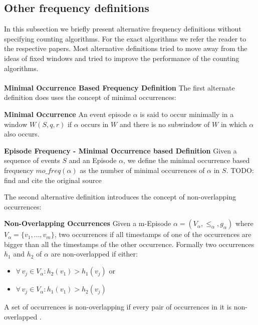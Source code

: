 \subsection{Other frequency definitions}
\label{subsec_otherFrequency}

In this subsection we briefly present alternative frequency definitions without specifying counting algorithms. For the exact algorithms we refer the reader to the respective papers. \newline
Most alternative definitions tried to move away from the ideas of fixed windows and tried to improve the performance of the counting algorithms. \\
\\
\textbf{Minimal Occurrence Based Frequency Definition} \newline
The first alternate definition does uses the concept of minimal occurrences:

\begin{mydef}
\textbf{Minimal Occurrence} An event episode $\alpha$ is said to occur minimally in a window $W(S,q,r)$ if $\alpha$ occurs in $W$ and there is no subwindow of $W$ in which $\alpha$ also occurs. %
\end{mydef}

\begin{mydef}
\label{def_minimalOccuranceFrequency}
\textbf{Episode Frequency - Minimal Occurrence based Definition} Given a sequence of events $S$ and an Episode $\alpha$, we define the minimal occurrence based frequency $mo\_freq(\alpha )$ as the number of minimal occurrences of $\alpha$ in $S$. TODO: find and cite the original source
\end{mydef}

The second alternative definition introduces the concept of non-overlapping occurrences:

\begin{mydef}
\textbf{Non-Overlapping Occurrences} Given a m-Episode $\alpha = (V_\alpha,{\leq}_{\alpha},g_\alpha)$ where $V_\alpha = \{v_1,...,v_m\}$, two occurrences if all timestamps of one of the occurrences are bigger than all the timestamps of the other occurrence. Formally two occurrences $h_1$ and $h_2$ of $\alpha$ are non-overlapped if either:
\begin{itemize}
	\item $\forall \, v_j \in V_\alpha : h_2(v_1)>h_1(v_j)$ or 
	\item $\forall \, v_j \in V_\alpha : h_1(v_1)>h_2(v_j)$
\end{itemize}
A set of occurrences is non-overlapping if every pair of occurrences in it is non-overlapped \cite{laxman2007fast}.
\end{mydef}

